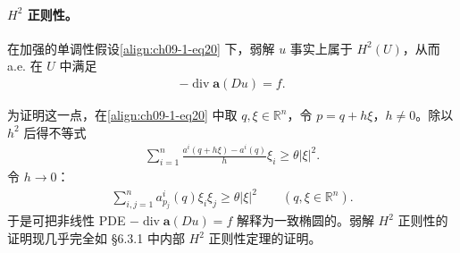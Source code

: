 \documentclass[../../main.tex]{subfiles}
\begin{document}
\paragraph{$H^2$ 正则性。}在加强的单调性假设\eqref{align:ch09-1-eq20} 下，弱解 $u$ 事实上属于 $H^2(U)$，从而 a.e. 在 $U$ 中满足
\begin{align*}
-\operatorname{div}\mathbf{a}(Du)=f.
\end{align*}

为证明这一点，在\eqref{align:ch09-1-eq20} 中取 $q,\xi\in\mathbb{R}^n$，令 $p=q+h\xi$，$h\neq 0$。除以 $h^2$ 后得不等式
\begin{align*}
\sum_{i=1}^n\frac{a^i(q+h\xi)-a^i(q)}{h}\xi_i\geqslant\theta|\xi|^2.
\end{align*}
令 $h\to 0$：
\begin{align}
\sum_{i,j=1}^n a^i_{p_j}(q)\xi_i\xi_j\geqslant\theta|\xi|^2\qquad (q,\xi\in\mathbb{R}^n).\label{align:ch09-1-eq21}
\end{align}
于是可把非线性 PDE $-\operatorname{div}\mathbf{a}(Du)=f$ 解释为一致椭圆的。弱解 $H^2$ 正则性的证明现几乎完全如 \S6.3.1 中内部 $H^2$ 正则性定理的证明。
\end{document}
